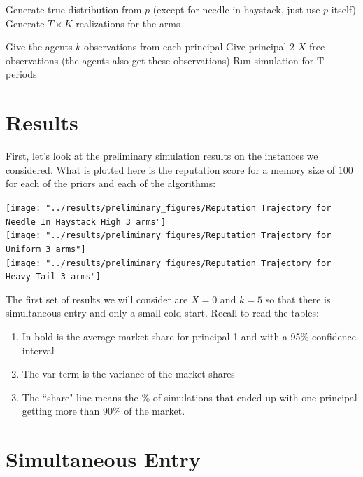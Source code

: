 \documentclass[11pt,letterpaper]{article}
\begin{document}
\begin{algorithm}
\begin{algorithmic}[1]
\State Generate true distribution from $p$ (except for needle-in-haystack, just use $p$ itself)
\State Generate $T \times K$ realizations for the arms 
				
				\State Give the agents $k$ observations from each principal
				\State Give principal 2 $X$ free observations (the agents also get these observations)
				\State Run simulation for T periods
			\EndFor
		\EndFor
	\EndFor
\EndFor
\end{algorithmic}
\end{algorithm}

\section*{Results}

First, let's look at the preliminary simulation results on the instances we considered. What is plotted here is the reputation score for a memory size of $100$ for each of the priors and each of the algorithms:

\texttt{[image: "../results/preliminary\_figures/Reputation Trajectory for Needle In Haystack High 3 arms"]} \\
\texttt{[image: "../results/preliminary\_figures/Reputation Trajectory for Uniform 3 arms"]} \\
\texttt{[image: "../results/preliminary\_figures/Reputation Trajectory for Heavy Tail 3 arms"]}

The first set of results we will consider are $X = 0$ and $k = 5$ so that there is simultaneous entry and only a small cold start. Recall to read the tables: \\
\begin{enumerate}
\item In bold is the average market share for principal 1 and with a 95\% confidence interval
\item The var term is the variance of the market shares
\item The ``share" line means the \% of simulations that ended up with one principal getting more than 90\% of the market.
\end{enumerate}

\section*{Simultaneous Entry}
\end{document}

